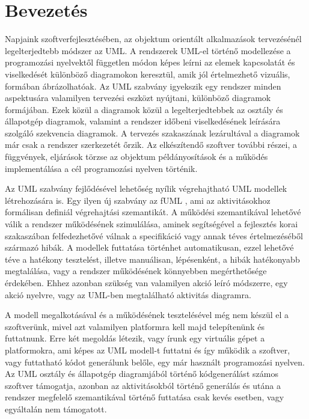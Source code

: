 \documentclass[a4paper,12pt]{report}
\begin{document}



\tableofcontents

\chapter{Bevezetés}

Napjaink szoftverfejlesztésében, az objektum orientált alkalmazások tervezésénél legelterjedtebb módszer az UML\cite{omg2008unified}.
A rendszerek UML-el történő modellezése a programozási nyelvektől független módon képes leírni az elemek kapcsolatát és
viselkedését különböző diagramokon keresztül, amik jól értelmezhető vizuális, formában ábrázolhatóak. Az UML szabvány igyekszik egy rendszer minden aspektusára
valamilyen tervezési eszközt nyújtani, különböző diagramok formájában. Ezek közül a diagramok közül a legelterjedtebbek az osztály és állapotgép diagramok,
valamint a rendszer időbeni viselkedésének leírására szolgáló szekvencia diagramok. A tervezés szakaszának lezárultával a diagramok már csak a rendszer szerkezetét
őrzik. Az elkészítendő szoftver további részei, a függvények, eljárások törzse az objektum példányosítások és a működés implementálása a cél programozási nyelven történik.

Az UML szabvány fejlődésével lehetőség nyílik végrehajtható UML modellek létrehozására is. Egy ilyen új szabvány az fUML \cite{fum}, ami az aktivitásokhoz formálisan definiál végrehajtási szemantikát.
A működési szemantikával lehetővé válik a rendszer működésének szimulálása, aminek segítségével a fejlesztés korai szakaszában felfedezhetővé válnak a specifikáció vagy annak téves értelmezéséből származó hibák. A modellek futtatása történhet automatikusan, ezzel lehetővé téve a hatékony tesztelést, illetve manuálisan, lépésenként, a hibák hatékonyabb megtalálása, vagy a rendszer működésének könnyebben megérthetősége érdekében. Ehhez azonban szükség van valamilyen akció leíró módszerre, egy akció nyelvre, vagy az UML-ben megtalálható aktivitás diagramra.

A modell megalkotásával és a működésének tesztelésével még nem készül el a szoftverünk, mivel azt valamilyen platformra kell majd telepítenünk és futtatnunk. Erre két megoldás létezik, vagy írunk egy virtuális gépet a platformokra, ami képes az UML modell-t futtatni és így működik a szoftver, vagy futtatható kódot generálunk belőle, egy már használt programozási nyelven. Az UML osztály és állapotgép diagramjából történő kódgenerálást számos szoftver támogatja, azonban az aktivitásokból történő generálás és utána a rendszer megfelelő szemantikával történő futtatása csak kevés esetben, vagy egyáltalán nem támogatott.
\end{document}

